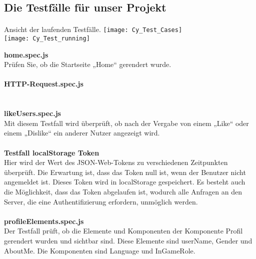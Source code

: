 \subsection{Die Testfälle für unser Projekt}
\paragraph{}
Ansicht der laufenden Testfälle.
\texttt{[image: Cy\_Test\_Cases]}
\\
\texttt{[image: Cy\_Test\_running]}

\newpage
\textbf{home.spec.js}\\
Prüfen Sie, ob die Startseite „Home“ gerendert wurde.
\\\\
\textbf{HTTP-Request.spec.js}\\
\\\\
\textbf{likeUsers.spec.js}\\
Mit diesem Testfall wird überprüft, ob nach der Vergabe von einem „Like“ oder einem „Dislike“ ein anderer Nutzer angezeigt wird.
\\\\
\textbf{Testfall localStorage Token}\\
Hier wird der Wert des JSON-Web-Tokens zu verschiedenen Zeitpunkten überprüft.
Die Erwartung ist, dass das Token null ist, wenn der Benutzer nicht angemeldet ist.
Dieses Token wird in localStorage gespeichert.
Es besteht auch die Möglichkeit, dass das Token abgelaufen ist, wodurch alle Anfragen an den Server, die eine Authentifizierung erfordern, unmöglich werden.
\\\\
\textbf{profileElements.spec.js}\\
Der Testfall prüft, ob die Elemente und Komponenten der Komponente Profil gerendert wurden und sichtbar sind. Diese Elemente sind userName, Gender und AboutMe. Die Komponenten sind Language und InGameRole.

